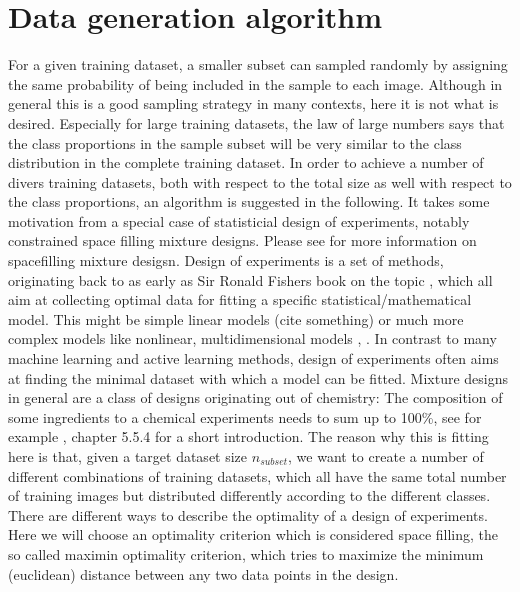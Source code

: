 \documentclass{article} %
\begin{document}
\section{Data generation algorithm}




     For a given training dataset, a smaller subset can sampled randomly by assigning the same probability of being included in the sample to each image.
     Although in general this is a good sampling strategy in many contexts, here it is not what is desired.
     Especially for large training datasets, the law of large numbers says that the class proportions in the sample subset will be very similar to the class distribution in the complete training dataset.
     In order to achieve a number of divers training datasets, both with respect to the total size as well with respect to the class proportions, an algorithm is suggested in the following.
     It takes some motivation from a special case of statisticial design of experiments, notably constrained space filling mixture designs. Please see \cite{gomes_hal_spacefilling_mixtures} for more information on spacefilling mixture desigsn.
     Design of experiments is a set of methods, originating back to as early as Sir Ronald Fishers book on the topic \cite{fisher_1935}, which all aim at collecting optimal data for fitting a specific statistical/mathematical model. This might be simple linear models (cite something) or much more complex 
        models like nonlinear, multidimensional models \cite{myers2009response}, \cite{Goos_Jones_optDoE_2011}. In contrast to many machine learning and active learning methods, design of experiments
        often aims at finding the minimal dataset with which a model can be fitted.  
     Mixture designs in general are a class of designs originating out of chemistry: The composition of some ingredients to a chemical experiments needs to sum up to 100\%, see for example \cite{Nist_2012_eng_stats}, chapter 5.5.4 for a short introduction.
     The reason why this is fitting here is that, given a target dataset size $n_{subset}$, we want to create a number of different combinations of training datasets, which all have the same total number of training images but distributed differently according to the different classes.
     There are different ways to describe the optimality of a design of experiments. Here we will choose an optimality criterion which is considered space filling, the so called maximin optimality criterion, which tries to maximize the minimum (euclidean) distance between any two data points in the design.
\end{document}
